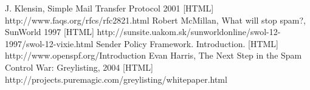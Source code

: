 \newpage
\begin{thebibliography}{99}
 J. Klensin, Simple Mail Transfer Protocol 2001 [HTML] http://www.faqs.org/rfcs/rfc2821.html 
 Robert McMillan, What will stop spam?, SunWorld 1997 [HTML] http://sunsite.uakom.sk/sunworldonline/swol-12-1997/swol-12-vixie.html
 Sender Policy Framework. Introduction.  [HTML] http://www.openspf.org/Introduction
 Evan Harris, The Next Step in the Spam Control War: Greylisting, 2004 [HTML] http://projects.puremagic.com/greylisting/whitepaper.html


\end{thebibliography}
